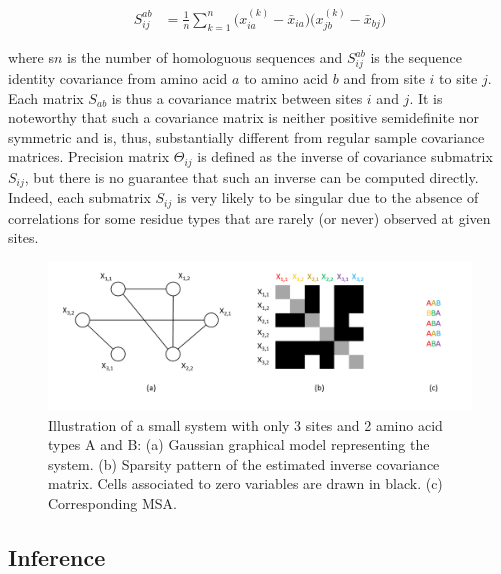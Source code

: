         \begin{equation} \label{covariance}
            \begin{split}
                S_{ij}^{ab} & = \frac{1}{n} \sum\limits_{k=1}^{n} \big( x_{ia}^{(k)} - \bar{x}_{ia} \big) \big( x_{jb}^{(k)} - \bar{x}_{bj} \big)
            \end{split}
        \end{equation}

        where s$n$ is the number of
        homologuous sequences and $S_{ij}^{ab}$ is the sequence identity covariance from amino acid $a$ to amino acid $b$ and from site $i$ to site $j$.
        Each matrix $S_{ab}$ is thus a covariance matrix between sites $i$ and $j$. It is noteworthy that such a covariance matrix is neither positive
        semidefinite nor symmetric and is, thus, substantially different from regular sample covariance matrices. Precision matrix $\Theta_{ij}$ is defined as
        the inverse of covariance submatrix $S_{ij}$, but there is no guarantee that such an inverse can be computed directly. Indeed, each submatrix
        $S_{ij}$ is very likely to be singular due to the absence of correlations for some residue types that are rarely (or never) observed at given sites.

        \begin{figure}[H]
            \begin{center}
                \includegraphics[width=\textwidth, keepaspectratio]{imgs/ggm.png}
                \caption{Illustration of a small system with only 3 sites and 2 amino acid types A and B:
                    (a) Gaussian graphical model representing the system.
                    (b) Sparsity pattern of the estimated inverse covariance matrix.
                    Cells associated to zero variables are drawn in black. (c) Corresponding MSA.}
                \label{thresholds}
            \end{center}
        \end{figure}

    \subsection{Inference}

